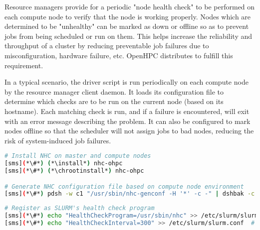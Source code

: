 Resource managers provide for a periodic "node health check" to be performed on
each compute node to verify that the node is working properly. Nodes which are
determined to be "unhealthy" can be marked as down or offline so as to prevent
jobs from being scheduled or run on them. This helps increase the reliability
and throughput of a cluster by reducing preventable job failures due to
misconfiguration, hardware failure, etc. OpenHPC distributes \nhc{} to fulfill
this requirement. 

In a typical scenario, the \nhc{} driver script is run periodically on each compute
node by the resource manager client daemon. It loads its
configuration file to determine which checks are to be run on the current node
(based on its hostname). Each matching check is run, and if a failure is
encountered, \nhc{} will exit with an error message describing the problem. It can
also be configured to mark nodes offline so that the scheduler will not assign
jobs to bad nodes, reducing the risk of system-induced job failures. 

\begin{lstlisting}[language=bash,keywords={},upquote=true]
# Install NHC on master and compute nodes
[sms](*\#*) (*\install*) nhc-ohpc
[sms](*\#*) (*\chrootinstall*) nhc-ohpc

# Generate NHC configuration file based on compute node environment
[sms](*\#*) pdsh -w c1 "/usr/sbin/nhc-genconf -H '*' -c -" | dshbak -c > /etc/nhc/nhc.conf.new

\end{lstlisting}

\begin{lstlisting}[language=bash,keywords={},upquote=true]
# Register as SLURM's health check program
[sms](*\#*) echo "HealthCheckProgram=/usr/sbin/nhc" >> /etc/slurm/slurm.conf
[sms](*\#*) echo "HealthCheckInterval=300" >> /etc/slurm/slurm.conf  # execute every five minutes
\end{lstlisting}
\fi

